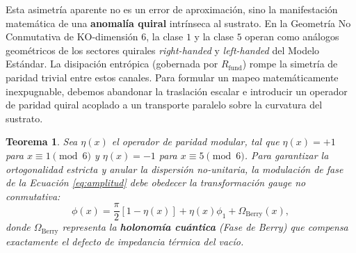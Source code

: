 \documentclass[12pt,a4paper]{article}
\theoremstyle{plain}
\newtheorem{teorema}{Teorema}[section]
\theoremstyle{definition}
\theoremstyle{remark}
\begin{document}
Esta asimetría aparente no es un error de aproximación, sino la manifestación matemática de una \textbf{anomalía quiral} intrínseca al sustrato. En la Geometría No Conmutativa de KO-dimensión 6, la clase $1$ y la clase $5$ operan como análogos geométricos de los sectores quirales \textit{right-handed} y \textit{left-handed} del Modelo Estándar. La disipación entrópica (gobernada por $R_{\text{fund}}$) rompe la simetría de paridad trivial entre estos canales. Para formular un mapeo matemáticamente inexpugnable, debemos abandonar la traslación escalar e introducir un operador de paridad quiral acoplado a un transporte paralelo sobre la curvatura del sustrato.

\begin{teorema}
Sea $\eta(x)$ el operador de paridad modular, tal que $\eta(x) = +1$ para $x \equiv 1 \pmod 6$ y $\eta(x) = -1$ para $x \equiv 5 \pmod 6$. Para garantizar la ortogonalidad estricta y anular la dispersión no-unitaria, la modulación de fase de la Ecuación \eqref{eq:amplitud} debe obedecer la transformación gauge no conmutativa:
\begin{equation}
    \phi(x) = \frac{\pi}{2} \left[1 - \eta(x)\right] + \eta(x) \phi_1 + \Omega_{\text{Berry}}(x),
\end{equation}
donde $\Omega_{\text{Berry}}$ representa la \textbf{holonomía cuántica} (Fase de Berry) que compensa exactamente el defecto de impedancia térmica del vacío.
\end{teorema}
\end{document}
